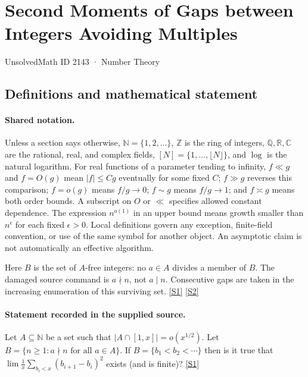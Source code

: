 \documentclass[11pt,a4paper]{article}
\newcommand{\N}{\mathbb{N}}
\newcommand{\Z}{\mathbb{Z}}
\newcommand{\Q}{\mathbb{Q}}
\newcommand{\R}{\mathbb{R}}
\newcommand{\C}{\mathbb{C}}
\newcommand{\sref}[2]{\hyperlink{source:#1:#2}{[S#2]}}
\begin{document}

\setcounter{section}{2142}

\section{Second Moments of Gaps between Integers Avoiding Multiples}\label{2143}

{\small\sffamily UnsolvedMath ID 2143 · Number Theory}

\subsection{Definitions and mathematical statement}

\paragraph{Shared notation.}Unless a section says otherwise, $\N=\{1,2,\ldots\}$,
$\Z$ is the ring of integers, $\Q,\R,\C$ are the rational, real, and complex
fields, $[N]=\{1,\ldots,\lfloor N\rfloor\}$, and $\log$ is the natural
logarithm. For real functions of a parameter tending to infinity,
$f\ll g$ and $f=O(g)$ mean $|f|\leq Cg$ eventually for some fixed $C$;
$f\gg g$ reverses this comparison; $f=o(g)$ means $f/g\to0$;
$f\sim g$ means $f/g\to1$; and $f\asymp g$ means both order bounds.
A subscript on $O$ or $\ll$ specifies allowed constant dependence.
The expression $n^{o(1)}$ in an upper bound means growth smaller than
$n^\epsilon$ for each fixed $\epsilon>0$. Local definitions govern any
exception, finite-field convention, or use of the same symbol for another
object. An asymptotic claim is not automatically an effective algorithm.



Here $B$ is the set of $A$-free integers: no $a\in A$ divides a member of $B$. The damaged source command is $a\nmid n$, not $a\mid n$. Consecutive gaps are taken in the increasing enumeration of this surviving set. \sref{2143}{1} \sref{2143}{2}

\paragraph{Statement recorded in the supplied source.}
Let $A\subseteq \mathbb{N}$ be a set such that $\lvert A\cap [1,x]\rvert=o(x^{1/2})$. Let $ B=\{ n\geq 1 : a\nmid n\textrm{ for all }a\in A\}. $ If $B=\{b_1<b_2<\cdots\}$ then is it true that $ \lim \frac{1}{x}\sum_{b_i<x}(b_{i+1}-b_i)^2 $ exists (and is finite)? \sref{2143}{1}
\end{document}

